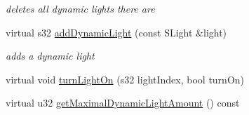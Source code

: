 \begin{DoxyCompactItemize}
\begin{DoxyCompactList}\small\item\em deletes all dynamic lights there are \end{DoxyCompactList}\item 
virtual s32 \hyperlink{classirr_1_1video_1_1_c_null_driver_acbf735dfd4c8b337d0a884c8fe58e7f5}{add\-Dynamic\-Light} (const S\-Light \&light)
\begin{DoxyCompactList}\small\item\em adds a dynamic light \end{DoxyCompactList}\item 
virtual void \hyperlink{classirr_1_1video_1_1_c_null_driver_ad8e98688587af390bead4c054cfa19f9}{turn\-Light\-On} (s32 light\-Index, bool turn\-On)
\item 
\hypertarget{classirr_1_1video_1_1_c_null_driver_ae9610d34f3aeee060323c21d175bbaf3}{virtual u32 \hyperlink{classirr_1_1video_1_1_c_null_driver_ae9610d34f3aeee060323c21d175bbaf3}{get\-Maximal\-Dynamic\-Light\-Amount} () const }\label{classirr_1_1video_1_1_c_null_driver_ae9610d34f3aeee060323c21d175bbaf3}


\end{DoxyCompactItemize}
